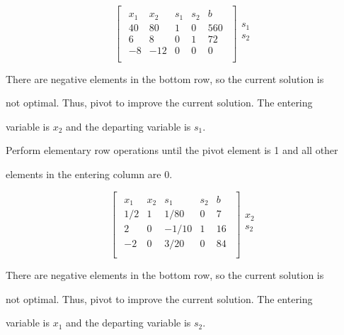 \documentclass{article}
\begin{document}
\[
\begin{bmatrix}
\begin{array}{cccc|c}
x_1 & x_2 & s_1 & s_2 & b \\
\hline
40 & 80 & 1 & 0 & 560 \\
6 & 8 & 0 & 1 & 72 \\
\hline
-8 & -12 & 0 & 0 & 0 \\
\end{array}
\end{bmatrix}
\begin{array}{c}
\\
s_1 \\
s_2 \\
\\
\end{array}
\]

There are negative elements in the bottom row, so the current solution is 

not optimal. Thus, pivot to improve the current solution. The entering 

variable is \(x_2\) and the departing variable is \(s_1\).

\vspace{\baselineskip}

Perform elementary row operations until the pivot element is 1 and all other 

elements in the entering column are 0.

\[
\begin{bmatrix}
\begin{array}{cccc|c}
x_1 & x_2 & s_1 & s_2 & b \\
\hline
1/2 & 1 & 1/80 & 0 & 7 \\
2 & 0 & -1/10 & 1 & 16 \\
\hline
-2 & 0 & 3/20 & 0 & 84 \\
\end{array}
\end{bmatrix}
\begin{array}{c}
\\
x_2 \\
s_2 \\
\\
\end{array}
\]

There are negative elements in the bottom row, so the current solution is 

not optimal. Thus, pivot to improve the current solution. The entering 

variable is \(x_1\) and the departing variable is \(s_2\).
\end{document}
